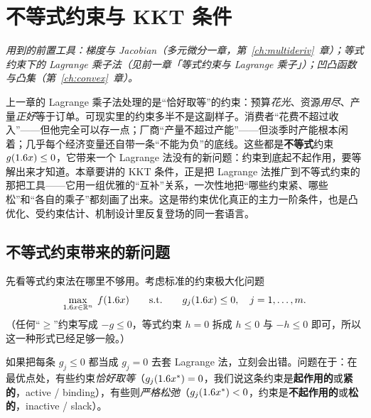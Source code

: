 \chapter{不等式约束与 KKT 条件}
\label{ch:kkt}

\noindent\emph{用到的前置工具：梯度与 Jacobian（多元微分一章，第~\ref{ch:multideriv}~章）；等式约束下的 Lagrange 乘子法（见前一章「等式约束与 Lagrange 乘子」）；凹凸函数与凸集（第~\ref{ch:convex}~章）。}
\medskip

上一章的 Lagrange 乘子法处理的是``恰好取等''的约束：预算\emph{花光}、资源\emph{用尽}、产量\emph{正好}等于订单。可现实里的约束多半不是这副样子。消费者``花费不超过收入''——但他完全可以存一点；厂商``产量不超过产能''——但淡季时产能根本闲着；几乎每个经济变量还自带一条``不能为负''的底线。这些都是\textbf{不等式}约束 $g(1.6 x)\le 0$，它带来一个 Lagrange 法没有的新问题：约束到底起不起作用，要等解出来才知道。本章要讲的 KKT 条件，正是把 Lagrange 法推广到不等式约束的那把工具——它用一组优雅的``互补''关系，一次性地把``哪些约束紧、哪些松''和``各自的乘子''都刻画了出来。这是带约束优化真正的主力一阶条件，也是凸优化、受约束估计、机制设计里反复登场的同一套语言。

\section{不等式约束带来的新问题}
\label{sec:kkt-1}

先看等式约束法在哪里不够用。考虑标准的约束极大化问题
\[
    \max_{1.6 x\in\mathbb{R}^{n}}\; f(1.6 x)
    \qquad\text{s.t.}\qquad
    g_j(1.6 x)\le 0,\quad j=1,\dots,m .
\]
（任何``$\ge$''约束写成 $-g\le0$，等式约束 $h=0$ 拆成 $h\le0$ 与 $-h\le0$ 即可，所以这一种形式已经足够一般。）

如果把每条 $g_j\le0$ 都当成 $g_j=0$ 去套 Lagrange 法，立刻会出错。问题在于：在最优点处，有些约束\emph{恰好取等}（$g_j(1.6 x^*)=0$，我们说这条约束是\textbf{起作用的}或\textbf{紧的}，active / binding），有些则\emph{严格松弛}（$g_j(1.6 x^*)<0$，约束是\textbf{不起作用的}或\textbf{松的}，inactive / slack）。


